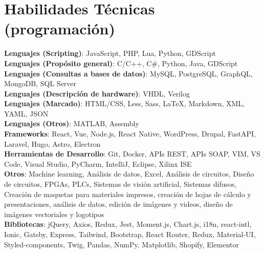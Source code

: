 \documentclass[letterpaper,11pt]{article}
\makeatletter
\newcommand{\resumeItem}[1]{
  \item\small{
    {#1 \vspace{-2pt}}
  }
}
\newcommand{\resumeProjectHeading}[2]{
    \item
    \begin{tabular*}{0.97\textwidth}{l@{\extracolsep{\fill}}r}
      \small#1 & #2 \\
    \end{tabular*}\vspace{-7pt}
}
\newcommand{\resumeSubHeadingListStart}{\begin{itemize}[leftmargin=0.15in, label={}]}
\newcommand{\resumeSubHeadingListEnd}{\end{itemize}}
\newcommand{\resumeItemListStart}{\begin{itemize}}
\newcommand{\resumeItemListEnd}{\end{itemize}\vspace{-5pt}}
\makeatother
\begin{document}

\section{Habilidades Técnicas (programación)}
\begin{itemize}[leftmargin=0.15in, label={}]
  \small{\item{
    \textbf{Lenguajes (Scripting)}{: JavaScript, PHP, Lua, Python, GDScript} \\
    \textbf{Lenguajes (Propósito general)}{: C/C++, C\#, Python, Java, GDScript} \\
    \textbf{Lenguajes (Consultas a bases de datos)}{: MySQL, PostgreSQL, GraphQL, MongoDB, SQL Server} \\
    \textbf{Lenguajes (Descripción de hardware)}{: VHDL, Verilog} \\
    \textbf{Lenguajes (Marcado)}{: HTML/CSS, Less, Sass, LaTeX, Markdown, XML, YAML, JSON} \\
    \textbf{Lenguajes (Otros)}{: MATLAB, Assembly} \\
    \textbf{Frameworks}{: React, Vue, Node.js, React Native, WordPress, Drupal, FastAPI, Laravel, Hugo, Astro, Electron} \\
    \textbf{Herramientas de Desarrollo}{: Git, Docker, APIs REST, APIs SOAP, VIM, VS Code, Visual Studio, PyCharm, IntelliJ, Eclipse, Xilinx ISE} \\
    \textbf{Otros}{: Machine learning, Análisis de datos, Excel, Análisis de circuitos, Diseño de circuitos, FPGAs, PLCs, Sistemas de visión artificial, Sistemas difusos, Creación de maquetas para materiales impresos, creación de hojas de cálculo y presentaciones, análisis de datos, edición de imágenes y videos, diseño de imágenes vectoriales y logotipos} \\
    \textbf{Bibliotecas}{: jQuery, Axios, Redux, Jest, Moment.js, Chart.js, i18n, react-intl, Ionic, Gatsby, Express, Tailwind, Bootstrap, React Router, Redux, Material-UI, Styled-components, Twig, Pandas, NumPy, Matplotlib, Shopify, Elementor}
  }}
\end{itemize}
\end{document}
